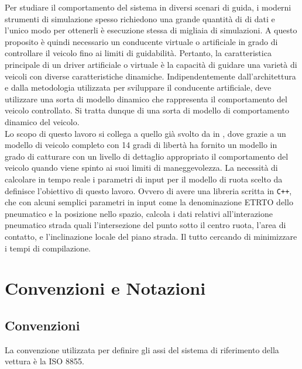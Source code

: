 Per studiare il comportamento del sistema in diversi scenari di guida, i moderni strumenti di simulazione spesso richiedono una grande quantità di di dati e l'unico modo per ottenerli è esecuzione stessa di migliaia di simulazioni. A questo proposito è quindi necessario un conducente virtuale o artificiale in grado di controllare il veicolo fino ai limiti di guidabilità. Pertanto, la caratteristica principale di un driver artificiale o virtuale è la capacità di guidare una varietà di veicoli con diverse caratteristiche dinamiche. Indipendentemente dall'architettura e dalla metodologia utilizzata per sviluppare il conducente artificiale, deve utilizzare una sorta di modello dinamico che rappresenta il comportamento del veicolo controllato. Si tratta dunque di una sorta di modello di comportamento dinamico del veicolo.\\
Lo scopo di questo lavoro si collega a quello già svolto da \citeauthor{Larcher} in \cite{Larcher}, dove grazie a un modello di veicolo completo con 14 gradi di libertà ha fornito un modello in grado di catturare con un livello di dettaglio appropriato il comportamento del veicolo quando viene spinto ai suoi limiti di maneggevolezza. La necessità di calcolare in tempo reale i parametri di input per il modello di ruota scelto da \cite{Larcher} definisce l'obiettivo di questo lavoro. Ovvero di avere una libreria scritta in \texttt{C++}, che con alcuni semplici parametri in input come la denominazione \ac{ETRTO} dello pneumatico e la posizione nello spazio, calcola i dati relativi all'interazione pneumatico strada quali l'intersezione del punto sotto il centro ruota, l'area di contatto, e l'inclinazione locale del piano strada. Il tutto cercando di minimizzare i tempi di compilazione.
%
\section{Convenzioni e Notazioni}
\label{Notazioni}
%
\subsection{Convenzioni}
La convenzione utilizzata per definire gli assi del sistema di riferimento della vettura è la \ac{ISO} 8855.

